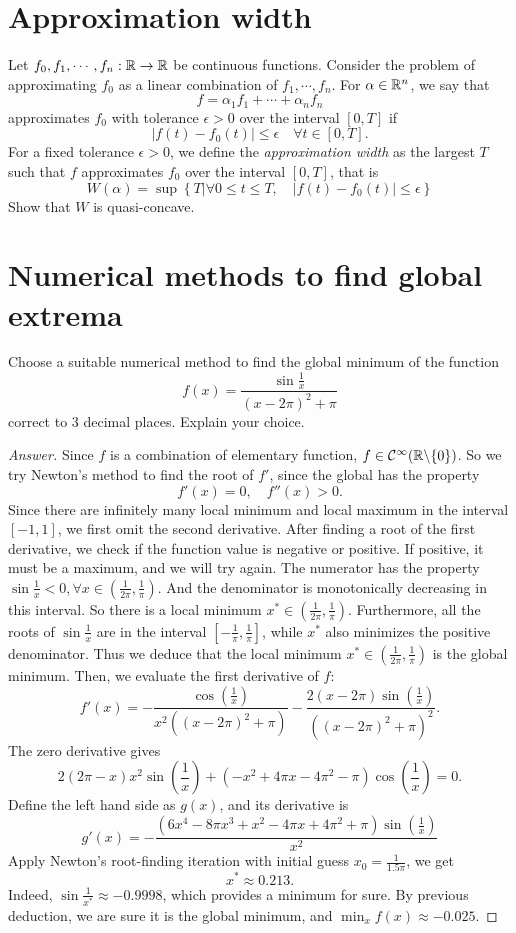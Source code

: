 \section{Approximation width}
Let \(f_0, f_1, \cdots, f_n: \mathbb{R} \to \mathbb{R}\) be continuous functions.
Consider the problem of approximating \(f_0\) as a linear combination of \(f_1, \cdots, f_n\).
For \(\alpha\in\mathbb{R}^n\), we say that
\[ f=\alpha_1f_1+\cdots+\alpha_n f_n \]
approximates \(f_0\) with tolerance \(\epsilon > 0\) over the interval \([0, T]\) if
\[ |f(t)-f_0(t)|\leq\epsilon \quad \forall t\in[0,T]. \]
For a fixed tolerance \(\epsilon > 0\), we define the \emph{approximation width} as the largest \(T\) such that \(f\) approximates \(f_0\) over the interval \([0, T]\), that is
\[ W(\alpha) = \sup \left\{ T | \forall 0 \leq t \leq T, \quad |f(t) - f_0(t)| \leq\epsilon \right\} \]
Show that \(W\) is quasi-concave.


\section{Numerical methods to find global extrema}
Choose a suitable numerical method to find the global minimum of the function
\[ f(x)=\frac{\sin\frac{1}{x}}{(x-2\pi)^2+\pi} \]
correct to 3 decimal places.
Explain your choice.
\begin{proof}[Answer]
	Since \(f\) is a combination of elementary function, \(f\in\mathcal{C}^\infty(\mathbb{R}\backslash\{0\})\).
	So we try Newton's method to find the root of \(f'\), since the global has the property
	\[ f'(x)=0, \quad f''(x)>0. \]
	Since there are infinitely many local minimum and local maximum in the interval \([-1,1]\), we first omit the second derivative.
	After finding a root of the first derivative, we check if the function value is negative or positive.
	If positive, it must be a maximum, and we will try again.
	The numerator has the property \(\sin\frac{1}{x}<0,\forall x\in\left(\frac{1}{2\pi},\frac{1}{\pi}\right)\).
	And the denominator is monotonically decreasing in this interval.
	So there is a local minimum \(x^*\in\left(\frac{1}{2\pi},\frac{1}{\pi}\right)\).
	Furthermore, all the roots of \(\sin\frac{1}{x}\) are in the interval \(\left[-\frac{1}{\pi},\frac{1}{\pi}\right]\), while \(x^*\) also minimizes the positive denominator.
	Thus we deduce that the local minimum \(x^*\in\left(\frac{1}{2\pi},\frac{1}{\pi}\right)\) is the global minimum.
	Then, we evaluate the first derivative of \(f\):
	\[	f'(x)=	-\frac{\cos \left(\frac{1}{x}\right)}{x^2 \left((x-2 \pi )^2+\pi \right)}-\frac{2 (x-2 \pi ) \sin \left(\frac{1}{x}\right)}{\left((x-2 \pi )^2+\pi \right)^2}.	\]
	The zero derivative gives
	\[ 2 (2 \pi -x) x^2 \sin \left(\frac{1}{x}\right)+\left(-x^2+4 \pi  x-4 \pi ^2-\pi \right) \cos \left(\frac{1}{x}\right)=0. \]
	Define the left hand side as \(g(x)\), and its derivative is
	\[ g'(x)=-\frac{\left(6 x^4-8 \pi  x^3+x^2-4 \pi  x+4 \pi ^2+\pi \right) \sin \left(\frac{1}{x}\right)}{x^2} \]
	Apply Newton's root-finding iteration with initial guess
	\(x_0=\frac{1}{1.5\pi}\), we get
	\[ x^*\approx0.213. \]
	Indeed, \(\sin\frac{1}{x^*}\approx-0.9998\), which provides a minimum for sure.
	By previous deduction, we are sure it is the global minimum, and \(\min_x f(x)\approx-0.025\).
\end{proof}


